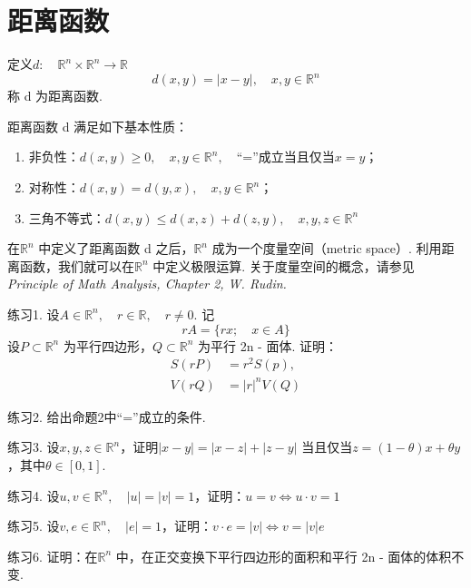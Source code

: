 \documentclass{article}
\begin{document}
\newpage

\section{距离函数}

\begin{definition}{}{}
    定义\(d:\quad \mathbb{R}^n \times \mathbb{R}^n \to \mathbb{R}\)
    \begin{equation*}
        d(x, y) = |x - y|,\quad x,y \in \mathbb{R}^n
    \end{equation*}
    称 d 为距离函数.
\end{definition}

距离函数 d 满足如下基本性质：
\begin{enumerate}
    \item 非负性：\(d(x, y) \ge 0,\quad x, y \in \mathbb{R}^n,\quad \)“=”成立当且仅当\(x = y\)；
    \item 对称性：\(d(x, y) = d(y, x),\quad x, y \in \mathbb{R}^n\)；
    \item 三角不等式：\(d(x, y) \le d(x, z) + d(z, y),\quad x, y, z \in \mathbb{R}^n\)
\end{enumerate}

\vspace{10pt}

在\(\mathbb{R}^n\) 中定义了距离函数 d 之后，\(\mathbb{R}^n\) 成为一个度量空间（metric space）. 利用距离函数，我们就可以在\(\mathbb{R}^n\) 中定义极限运算. 关于度量空间的概念，请参见 \textit{Principle of Math Analysis, Chapter 2, W. Rudin. }

\newpage

练习1.  设\(A \in \mathbb{R}^n,\quad r \in \mathbb{R},\quad r \neq 0\). 记
\begin{equation*}
    r A = \{rx;\quad x \in A\}
\end{equation*}
设\(P \subset \mathbb{R}^n\) 为平行四边形，\(Q \subset \mathbb{R}^n\) 为平行 2n - 面体. 证明：
\begin{align*}
    S(r P) &=  r^2S(p), \\
    V(r Q) &= |r|^n V(Q)
\end{align*}

\vspace{10pt}

练习2.  给出命题2中“=”成立的条件.

\vspace{30pt}

练习3.  设\(x, y, z \in \mathbb{R}^n\)，证明\(|x - y|= |x - z|+ |z - y|\) 当且仅当\(z =(1 - \theta )x + \theta y\)，其中\(\theta \in [0,1]\).

\vspace{30pt}

练习4.  设\(u, v \in \mathbb{R}^n,\quad |u|= |v| = 1\)，证明：\(u = v \iff u \cdot v = 1\)

\vspace{30pt}

练习5.  设\(v, e \in \mathbb{R}^n,\quad |e|= 1\)，证明：\(v \cdot e = |v| \iff v = |v|e\)

\vspace{20pt}

练习6.  证明：在\(\mathbb{R}^n\) 中，在正交变换下平行四边形的面积和平行 2n - 面体的体积不变.
\end{document}

